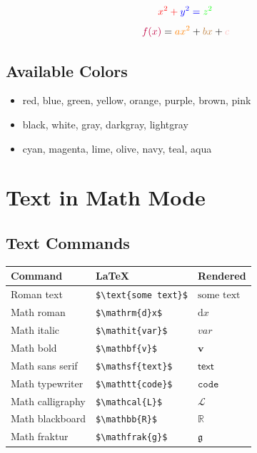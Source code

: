 \documentclass[
  letterpaper,
  DIV=11,
  numbers=noendperiod]{scrartcl}
\providecommand{\tightlist}{%
  \setlength{\itemsep}{0pt}\setlength{\parskip}{0pt}}\usepackage{longtable,booktabs,array}
\begin{document}
\[\color{red}{x^2} + \color{blue}{y^2} = \color{green}{z^2}\]
\[\textcolor{purple}{f(x)} = \textcolor{orange}{ax^2} + \textcolor{brown}{bx} + \textcolor{pink}{c}\]

\hypertarget{available-colors}{%
\subsection{Available Colors}\label{available-colors}}

\begin{itemize}
\tightlist
\item
  red, blue, green, yellow, orange, purple, brown, pink
\item
  black, white, gray, darkgray, lightgray
\item
  cyan, magenta, lime, olive, navy, teal, aqua
\end{itemize}

\hypertarget{text-in-math-mode}{%
\section{Text in Math Mode}\label{text-in-math-mode}}

\hypertarget{text-commands}{%
\subsection{Text Commands}\label{text-commands}}

\begin{longtable}[]{@{}lll@{}}
\toprule()
Command & LaTeX & Rendered \\
\midrule()
\endhead
Roman text & \texttt{\$\textbackslash{}text\{some\ text\}\$} &
\(\text{some text}\) \\
Math roman & \texttt{\$\textbackslash{}mathrm\{d\}x\$} &
\(\mathrm{d}x\) \\
Math italic & \texttt{\$\textbackslash{}mathit\{var\}\$} &
\(\mathit{var}\) \\
Math bold & \texttt{\$\textbackslash{}mathbf\{v\}\$} & \(\mathbf{v}\) \\
Math sans serif & \texttt{\$\textbackslash{}mathsf\{text\}\$} &
\(\mathsf{text}\) \\
Math typewriter & \texttt{\$\textbackslash{}mathtt\{code\}\$} &
\(\mathtt{code}\) \\
Math calligraphy & \texttt{\$\textbackslash{}mathcal\{L\}\$} &
\(\mathcal{L}\) \\
Math blackboard & \texttt{\$\textbackslash{}mathbb\{R\}\$} &
\(\mathbb{R}\) \\
Math fraktur & \texttt{\$\textbackslash{}mathfrak\{g\}\$} &
\(\mathfrak{g}\) \\
\bottomrule()
\end{longtable}
\end{document}
